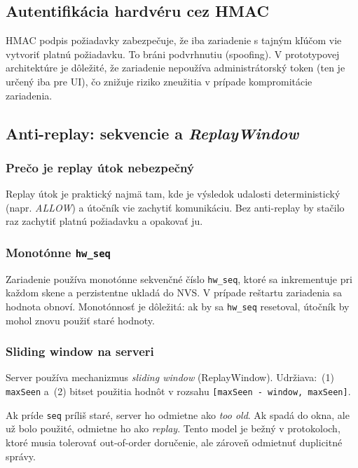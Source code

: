 \documentclass[journal,a4paper,onecolumn]{IEEEtran}
\begin{document}
\subsection{Autentifikácia hardvéru cez HMAC}

HMAC podpis požiadavky zabezpečuje, že iba zariadenie s tajným kľúčom vie vytvoriť platnú požiadavku. To bráni podvrhnutiu (spoofing). V prototypovej architektúre je dôležité, že zariadenie nepoužíva administrátorský token (ten je určený iba pre UI), čo znižuje riziko zneužitia v prípade kompromitácie zariadenia.

\subsection{Anti-replay: sekvencie a \emph{ReplayWindow}}

\subsubsection{Prečo je replay útok nebezpečný}

Replay útok je praktický najmä tam, kde je výsledok udalosti deterministický (napr. \emph{ALLOW}) a útočník vie zachytiť komunikáciu. Bez anti-replay by stačilo raz zachytiť platnú požiadavku a opakovať ju.

\subsubsection{Monotónne \texttt{hw\_seq}}

Zariadenie používa monotónne sekvenčné číslo \texttt{hw\_seq}, ktoré sa inkrementuje pri každom skene a perzistentne ukladá do NVS. V prípade reštartu zariadenia sa hodnota obnoví. Monotónnosť je dôležitá: ak by sa \texttt{hw\_seq} resetoval, útočník by mohol znovu použiť staré hodnoty.

\subsubsection{Sliding window na serveri}

Server používa mechanizmus \emph{sliding window} (ReplayWindow). Udržiava:\
(1) \texttt{maxSeen} a\
(2) bitset použitia hodnôt v rozsahu \texttt{[maxSeen - window, maxSeen]}.

Ak príde \texttt{seq} príliš staré, server ho odmietne ako \emph{too old}. Ak spadá do okna, ale už bolo použité, odmietne ho ako \emph{replay}. Tento model je bežný v protokoloch, ktoré musia tolerovať out-of-order doručenie, ale zároveň odmietnuť duplicitné správy.
\end{document}
